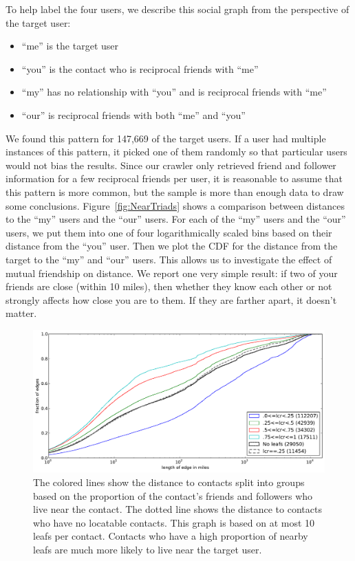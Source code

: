 To help label the four users, we describe this social graph from the
perspective of the target user:

\begin{itemize}
\item ``me'' is the target user
\item ``you'' is the contact who is reciprocal friends with ``me''
\item ``my'' has no relationship with ``you'' and is reciprocal friends with ``me''
\item ``our'' is reciprocal friends with both ``me'' and ``you''
\end{itemize}

We found this pattern for 147,669 of the target users.
%
If a user had multiple instances of this pattern, it picked one of them
randomly so that particular users would not bias the results.
%
Since our crawler only retrieved friend and follower information for a few
reciprocal friends per user, it is reasonable to assume that this pattern
is more common, but the sample is more than enough data to draw some
conclusions.
%
Figure~\ref{fig:NearTriads} shows a comparison between distances to the ``my''
users and the ``our'' users.
%
For each of the ``my'' users and the ``our'' users, we put them into one of
four logarithmically scaled bins based on their distance from the ``you'' user.
%
Then we plot the CDF for the distance from the target to the ``my'' and ``our'' users.
%
This allows us to investigate the effect of mutual friendship on distance.
We report one very simple result: if two of your friends are close (within 10
miles), then whether they know each other or not strongly affects how close
you are to them.
%
If they are farther apart, it doesn't matter.

\begin{figure}[tbh]
\centering
\includegraphics[width=\linewidth]{figures/locals_10.pdf}
\caption{
The colored lines show the distance to contacts split into groups based on the
proportion of the contact's friends and followers who live near the contact.
The dotted line shows the distance to contacts who have no locatable contacts.
This graph is based on at most 10 leafs per contact.
Contacts who have a high proportion of nearby leafs are much more likely to
live near the target user.
}
\label{fig:Local10}
\end{figure}

